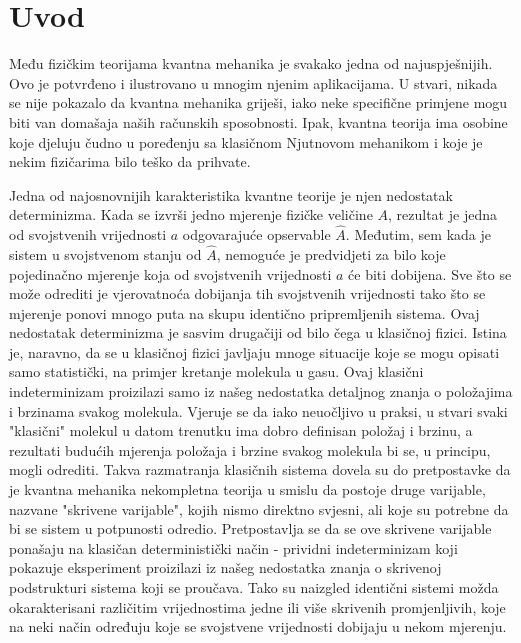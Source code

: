 \chapter{Uvod}

Među fizičkim teorijama kvantna mehanika je svakako jedna od najuspješnijih.
Ovo je potvrđeno i ilustrovano u mnogim njenim aplikacijama.
U stvari, nikada se nije
pokazalo da kvantna mehanika griješi, iako neke specifične primjene mogu biti van
domašaja naših računskih sposobnosti. Ipak, kvantna teorija ima osobine koje djeluju
čudno u poređenju sa klasičnom Njutnovom mehanikom i koje je nekim fizičarima bilo
teško da prihvate.

Jedna od najosnovnijih karakteristika kvantne teorije je njen nedostatak
determinizma. Kada se izvrši jedno mjerenje fizičke veličine $A$, rezultat je jedna od
svojstvenih vrijednosti $a$ odgovarajuće opservable $\hat{A}$.
Međutim, sem kada je sistem u svojstvenom stanju od $\hat{A}$,
nemoguće je predvidjeti za bilo koje pojedinačno mjerenje koja od svojstvenih vrijednosti $a$
će biti dobijena. Sve što se može odrediti je vjerovatnoća dobijanja tih svojstvenih
vrijednosti tako što se mjerenje ponovi mnogo puta na skupu identično pripremljenih
sistema. Ovaj nedostatak determinizma je sasvim drugačiji od bilo čega u klasičnoj
fizici. Istina je, naravno, da se u klasičnoj fizici javljaju mnoge situacije koje
se mogu opisati samo statistički, na primjer kretanje molekula u gasu. Ovaj klasični
indeterminizam proizilazi samo iz našeg nedostatka detaljnog znanja o položajima i
brzinama svakog molekula. Vjeruje se da iako neuočljivo u praksi, u stvari svaki
"klasični" molekul u datom trenutku ima dobro definisan položaj i brzinu, a
rezultati budućih mjerenja položaja i brzine svakog molekula bi se, u principu, mogli
odrediti. Takva razmatranja klasičnih sistema dovela su do pretpostavke da je
kvantna mehanika nekompletna teorija u smislu da postoje druge varijable, nazvane
"skrivene varijable", kojih nismo direktno svjesni, ali koje su potrebne da bi se
sistem u potpunosti odredio. Pretpostavlja se da se ove skrivene varijable ponašaju
na klasičan deterministički način - prividni indeterminizam koji pokazuje
eksperiment proizilazi iz našeg nedostatka znanja o skrivenoj podstrukturi sistema
koji se proučava. Tako su naizgled identični sistemi možda okarakterisani različitim
vrijednostima jedne ili više skrivenih promjenljivih, koje na neki način određuju koje
se svojstvene vrijednosti dobijaju u nekom mjerenju.

